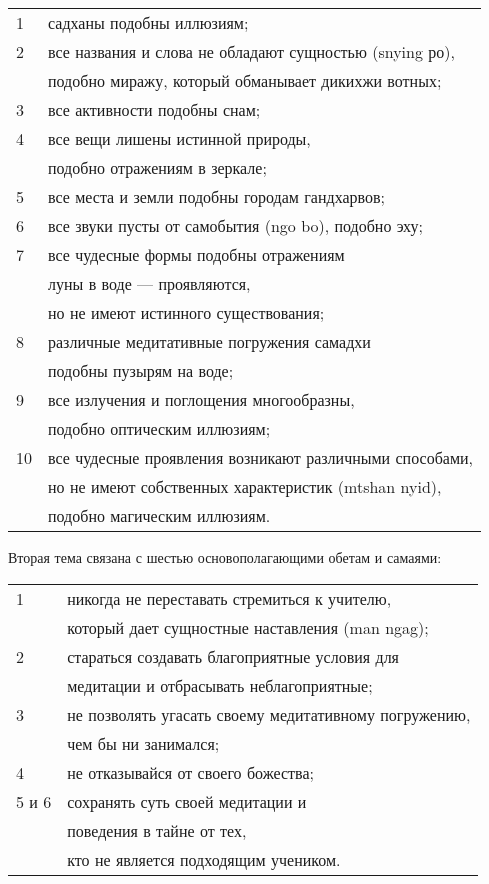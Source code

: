 \begin{tabular}{ll}
 1 & садханы подобны иллюзиям;\\
 2 & все названия и слова не обладают сущностью (snying ро),\\
   & подобно миражу, который обманывает дикихжи вотных;\\
 3 & все активности подобны снам;\\
 4 & все вещи лишены истинной природы, \\
   & подобно отражениям в зеркале;\\
 5 & все места и земли подобны городам гандхарвов;\\
 6 & все звуки пусты от самобытия (ngo bo), подобно эху;\\
 7 & все чудесные формы подобны отражениям \\
   & луны в воде — проявляются, \\
   & но не имеют истинного существования;\\
 8 & различные медитативные погружения самадхи \\
   & подобны пузырям на воде;\\
 9 & все излучения и поглощения многообразны, \\
   & подобно оптическим иллюзиям;\\
10 & все чудесные проявления возникают различными способами,\\
   & но не имеют собственных характеристик (mtshan nyid), \\
   & подобно магическим иллюзиям.\\
\end{tabular}

Вторая тема связана с шестью основополагающими обетам и самаями:\\

\begin{tabular}{ll}
1 & никогда не переставать стремиться к учителю, \\
  & который дает сущностные наставления (man ngag);\\
2 & стараться создавать благоприятные условия для \\
  & медитации и отбрасывать неблагоприятные;\\
3 & не позволять угасать своему медитативному погружению, \\
  & чем бы ни занимался; \\
4 & не отказывайся от своего божества; \\
5 и 6 & сохранять суть своей медитации и \\
  & поведения в тайне от тех, \\
  & кто не является подходящим учеником.
\end{tabular}
\\
